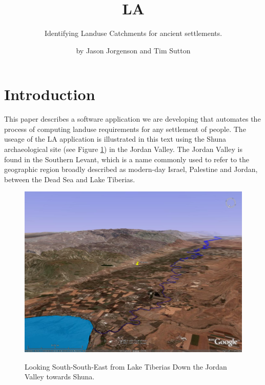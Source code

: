 

\title{LA} \subtitle{Identifying Landuse Catchments for 
ancient settlements.}

\author{by Jason Jorgenson and Tim Sutton}

\maketitle

\section{Introduction} \label{sec:Introduction}

This paper describes a software application we are developing that automates
the process of computing landuse requirements for any settlement of people.
The useage of the LA application is illustrated in this text using the  Shuna
archaeological site (see Figure \ref{fig:shunaGoogleEarth}) in the Jordan
Valley.  The Jordan Valley is found in the Southern Levant, which is a name
commonly used to refer to the geographic region broadly described as modern-day
Israel, Palestine and Jordan, between the Dead Sea and Lake Tiberias.

\begin{figure}[htbp] %
\includegraphics[scale=0.17]{./images/ShunaGoogleEarth3D.jpg}
\label{fig:shunaGoogleEarth} \caption{Looking South-South-East from Lake
Tiberias Down the Jordan Valley towards Shuna.} 
\end{figure}

